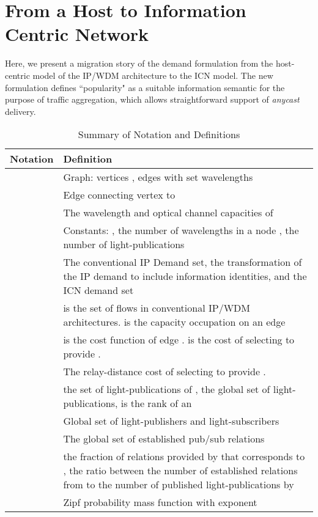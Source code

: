 \documentclass[journal]{IEEEtran}
\begin{document}
\section{From a Host to Information Centric Network}\label{sec:nm}
Here, we present a migration story of the demand formulation from the host-centric model of the IP/WDM architecture to the ICN model. The new formulation defines ``popularity" as a suitable information semantic for the purpose of traffic aggregation, which allows straightforward support of \emph{anycast} delivery.
\begin{table}[tb]
	\centering
	\caption{Summary of Notation and Definitions}
	\label{tab:not}
	\begin{tabular}[\columnwidth]{|p{}|p{}|}
		\hline
		Notation & Definition\\
		\hline 
		 & Graph: vertices , edges  with set 
                              wavelengths\\ 
		\hline
		 & Edge  connecting vertex  to \\	
		\hline
		 & The wavelength and optical channel capacities of \\
		\hline
		 & Constants: ,  the number of
                               wavelengths in a node ,  the number of light-publications\\
		\hline
		 & The conventional IP Demand set, the transformation of the IP demand to include information identities, and the ICN demand set\\
		\hline
		 &  is the set of flows in conventional IP/WDM architectures.  is the capacity occupation on an edge  \\
		\hline
		 &  is the cost function of edge .  is the cost of selecting  to provide .\\
		\hline
		 & The relay-distance cost of selecting  to provide .\\
		\hline
		 &  the set of light-publications of
                                 ,  the global set of light-publications,  is the rank of an \\
		\hline
		 & Global set of light-publishers  and
                          light-subscribers \\
		\hline
		 & The global set of established pub/sub relations\\
		\hline
		 &  the fraction of relations provided by  that corresponds to ,  the ratio between the number of established relations from  to the number of published light-publications by \\
		\hline
		 & Zipf probability mass
                                              function 
                                              with exponent \\
		\hline
	\end{tabular}
\end{table}
\end{document}
